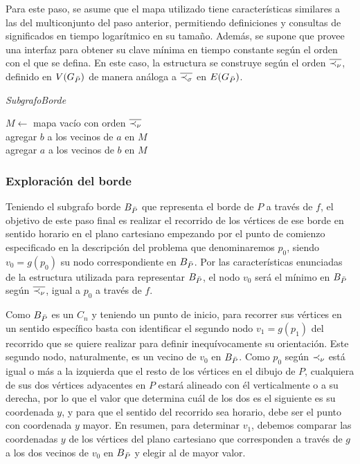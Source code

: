 Para este paso, se asume que el mapa utilizado tiene características similares a las del multiconjunto del paso anterior, permitiendo definiciones y consultas de significados en tiempo logarítmico en su tamaño. Además, se supone que provee una interfaz para obtener su clave mínima en tiempo constante según el orden con el que se defina. En este caso, la estructura se construye según el orden $\overline{\prec_{\nu}}$, definido en $V(G_{\bar{P}})$ de manera análoga a $\overline{\prec_{\sigma}}$ en $E(G_{\bar{P}})$.

\bigskip

\begin{algorithm}[H]
	\caption{\textit{SubgrafoBorde}}

	$M \gets$ mapa vacío con orden $\overline{\prec_{\nu}}$ \\
	
	     {
    		 {
			agregar $b$ a los vecinos de $a$ en $M$ \\
			agregar $a$ a los vecinos de $b$ en $M$ \\
		}
	}

\end{algorithm}

\subsubsection{Exploración del borde}

Teniendo el subgrafo borde $B_{\bar{P}}$ que representa el borde de $P$ a través de $f$, el objetivo de este paso final es realizar el recorrido de los vértices de ese borde en sentido horario en el plano cartesiano empezando por el punto de comienzo especificado en la descripción del problema que denominaremos $p_0$, siendo $v_0 = g(p_0)$ su nodo correspondiente en $B_{\bar{P}}$. Por las características enunciadas de la estructura utilizada para representar $B_{\bar{P}}$, el nodo $v_0$ será el mínimo en $B_{\bar{P}}$ según $\overline{\prec_{\nu}}$, igual a $p_0$ a través de $f$.

Como $B_{\bar{P}}$ es un $C_n$ y teniendo un punto de inicio, para recorrer sus vértices en un sentido específico basta con identificar el segundo nodo $v_1 = g(p_1)$ del recorrido que se quiere realizar para definir inequívocamente su orientación. Este segundo nodo, naturalmente, es un vecino de $v_0$ en $B_{\bar{P}}$. Como $p_0$ según $\prec_{\nu}$ está igual o más a la izquierda que el resto de los vértices en el dibujo de $P$, cualquiera de sus dos vértices adyacentes en $P$ estará alineado con él verticalmente o a su derecha, por lo que el valor que determina cuál de los dos es el siguiente es su coordenada $y$, y para que el sentido del recorrido sea horario, debe ser el punto con coordenada $y$ mayor. En resumen, para determinar $v_1$, debemos comparar las coordenadas $y$ de los vértices del plano cartesiano que corresponden a través de $g$ a los dos vecinos de $v_0$ en $B_{\bar{P}}$ y elegir al de mayor valor.

